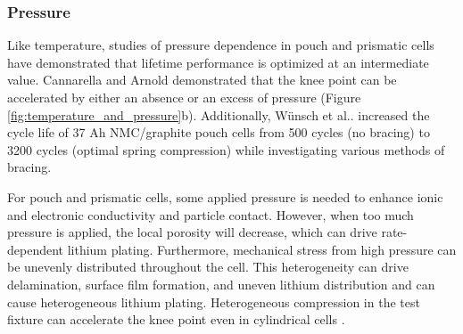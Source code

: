 \documentclass[journal=jpclcd,manuscript=article]{achemso}
\begin{document}
\subsubsection{Pressure}
Like temperature, studies of pressure dependence in pouch and prismatic cells have demonstrated that lifetime performance is optimized at an intermediate value. Cannarella and Arnold\cite{cannarella_stress_2014} demonstrated that the knee point can be accelerated by either an absence or an excess of pressure (Figure \ref{fig:temperature_and_pressure}b).
Additionally, Wünsch et al.\cite{wunsch_investigation_2019}. increased the cycle life of 37 Ah NMC/graphite pouch cells from 500 cycles (no bracing) to 3200 cycles (optimal spring compression) while investigating various methods of bracing.

For pouch and prismatic cells, some applied pressure is needed to enhance ionic and electronic conductivity and particle contact. However, when too much pressure is applied, the local porosity will decrease, which can drive rate-dependent lithium plating.
Furthermore, mechanical stress from high pressure can be unevenly distributed throughout the cell. This heterogeneity can drive delamination, surface film formation, and uneven lithium distribution and can cause heterogeneous lithium plating.
Heterogeneous compression in the test fixture can accelerate the knee point even in cylindrical cells \cite{bach_nonlinear_2016}.
\end{document}

